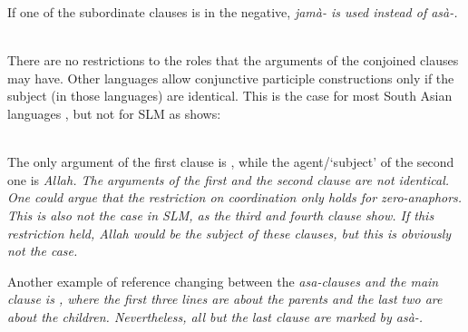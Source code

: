 If one of the subordinate clauses is in the negative, \em jamà- \em {} is used instead of \em asà-\em.
 
 \\
There are no restrictions to the roles that the arguments of the conjoined clauses may have. Other languages allow conjunctive participle constructions only if the subject (in those languages) are identical. This is the case for most South Asian languages \citep[108]{Masica1976}, but not for SLM  as  shows:

 \\
The only argument of the first clause is , while the agent/`subject' of the second one is \em Allah\em. The arguments of the first and the second clause are not identical. One could argue that the restriction on coordination only holds for zero-anaphors. This is also not the case in SLM, as the third and fourth clause show. If this restriction held, \em Allah \em would be the subject of these clauses, but this is obviously not the case.


Another example of reference changing between the \em asa\em-clauses and the main clause is , where the first three lines are about the parents and the last two are about the children. Nevertheless, all but the last clause are marked by \em asà-\em.


